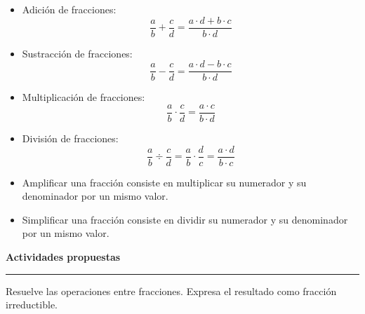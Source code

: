 \documentclass[spanish,letterpaper, 11pt, addpoints, answers]{exam}
\begin{document}
\begin{questions}
    \begin{itemize}
      \item Adición de fracciones: 
      $$\dfrac{a}{b}+\dfrac{c}{d}=\dfrac{a\cdot d+b\cdot c}{b\cdot d}$$
      \item Sustracción de fracciones: 
      $$\dfrac{a}{b}-\dfrac{c}{d}=\dfrac{a\cdot d-b\cdot c}{b\cdot d}$$
      \item Multiplicación de fracciones:
      $$\dfrac{a}{b}\cdot \dfrac{c}{d}=\dfrac{a\cdot c}{b\cdot d}$$
      \item División de fracciones:
      $$\dfrac{a}{b}\div \dfrac{c}{d}=\dfrac{a}{b}\cdot \dfrac{d}{c}=\dfrac{a\cdot d}{b\cdot c}$$
      \item Amplificar una fracción consiste en multiplicar su numerador y su denominador por un mismo valor.
      \item Simplificar una fracción consiste en dividir su numerador y su denominador por un mismo valor.
    \end{itemize}

    \parbox{6in}{
      \textbf{Actividades propuestas}}
      \vspace{0.15in}
      \hrule 

  \question Resuelve las operaciones entre fracciones. Expresa el resultado como fracción irreductible.
  \begin{multicols}{2}
    
  


\end{multicols}
\end{questions}
\end{document}
